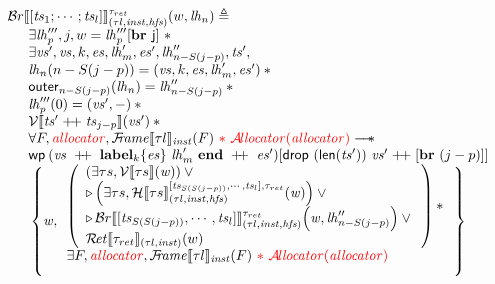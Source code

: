 \documentclass{standalone}
\begin{document}
\[
\begin{array}{l}
  \BRvalid \llbracket [\V{ts}_1; \cdots; \V{ts}_l] \rrbracket_{(\tau l, \V{inst}, \V{hfs})}^{\tau_{ret}}(w,\V{lh}_n) \triangleq
\\
  \quad
  \begin{array}{l}
    \exists \V{lh}'''_{p},j, w = \V{lh}'''_{p}[\K{\textbf{br }j}]~ \ast
  \\
    \exists \V{vs}',\V{vs}, k, \V{es}, \V{lh}'_m, \V{es}', \V{lh}''_{n - S(j - p)}, \V{ts}',
  \\
    \V{lh}_n(n - S(j - p)) = (\V{vs},k,\V{es},\V{lh}'_m,\V{es}') \ast {}
  \\
    \K{outer}_{n - S(j - p)}(\V{lh}_n) = \V{lh}''_{n - S(j - p)} \ast {}
  \\
    \V{lh}'''_p(0) = (\V{vs}',-) \ast {}
  \\
    \Vvalid\llbracket \V{ts}' \app \V{ts}_{j - p} \rrbracket(\V{vs}') \ast {}
  \\
    \forall F, \rr{\V{allocator}}, \FRvalid\llbracket \tau l \rrbracket_{\V{inst}}(F) \rr{~\ast{}~\Avalid(\V{allocator})} \wand
  \\
    \wprectxml{\V{vs}}{k}{\V{es}}{\V{lh}_{m}'}{\V{es'}}{\K{drop}~(\K{len}(\V{ts}'))~\V{vs}' \app [\KK{br}~(j - p)]}
	{\V{w},
        \begin{array}{l}
          \left(
          \begin{array}{l}
          (\exists \tau s, \Vvalid \llbracket \tau s \rrbracket(\V{w})) \vee {} \\
          \later \left( \exists \tau s, \Hvalid \llbracket \tau s \rrbracket_{(\tau l, \V{inst}, \V{hfs})}^{[\V{ts}_{S(S(j - p))}, \cdots, \V{ts}_l], \tau_{ret}}(\V{w}) \right) \vee {} \\
	  \later \BRvalid \llbracket [\V{ts}_{S(S(j - p))}, \cdots, \V{ts}_l] \rrbracket_{(\tau l, \V{inst},\V{hfs})}^{\tau_{ret}}{ \left( \V{w},\V{lh}''_{n - S(j - p)} \right) } \vee {}
	  \\
	  \Rvalid \llbracket \tau_{ret} \rrbracket_{(\tau l, \V{inst})}(w)
	  \end{array}
	  \right) \ast {}
	\\
	  \exists F, \rr{\V{allocator}}, \FRvalid\llbracket \tau l \rrbracket_{\V{inst}}(F)\rr{~\ast{}~ \Avalid(\V{allocator})}\\[1em]
	\end{array}}
  \end{array}
\end{array}
\]
\end{document}
